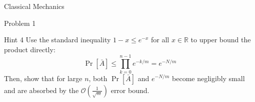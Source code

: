 \documentclass{beamer}
\begin{document}
\begin{section}{Classical Mechanics}
\begin{subsection}{Problem 1}
    \begin{frame}
        \begin{block}{Hint 4}
            Use the standard inequality $1 - x \le e^{-x}$ for all $x \in \mathbb{R}$ to upper bound the product directly:
            \[
                \Pr[\bar{A}] \le \prod_{k=0}^{n-1} e^{-k/m} = e^{-N/m}
            \]
            Then, show that for large $n$, both $\Pr[\bar{A}]$ and $e^{-N/m}$ become negligibly small and are absorbed by the $\mathcal{O}\left(\frac{1}{\sqrt{m}}\right)$ error bound.
        \end{block}
    \end{frame}
\end{subsection}

\end{section}
\end{document}
